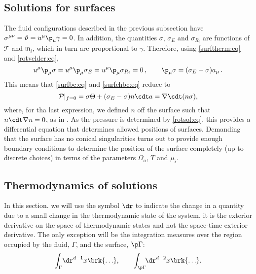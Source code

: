 \documentclass[12pt]{article}
\newcommand{\tloc}{\mathcal{T}}
\newcommand{\ploc}{\mathcal{P}}
\newcommand{\ml}{\mathfrak{m}}
\newcommand{\mg}{\mu}
\newcommand{\vint}{\int_\Gamma\!\dr^{d-1}x}
\newcommand{\aint}{\int_{\p\Gamma}\!\!\dr^{d-2}x}
\begin{document}
\subsection{Solutions for surfaces}\label{sec:rotsurf}

The fluid configurations described in the previous subsection have $\sigma^{\mu\nu}=\vartheta=u^\mu\p_\mu\gamma=0$.
In addition, the quantities $\sigma$, $\sigma_E$ and $\sigma_{R_i}$ are functions of $\tloc$ and $\ml_i$, which in turn are proportional to $\gamma$.
Therefore, using \eqref{surftherm:eq} and \eqref{rotvelder:eq},
%
\begin{equation}\label{rotsigmagrad:eq}
  u^\mu\p_\mu\sigma=u^\mu\p_\mu\sigma_E=u^\mu\p_\mu\sigma_{R_i}=0\,,
  \qquad
  \p_\mu \sigma = (\sigma_E - \sigma)a_\mu\,.
\end{equation}
%
This means that \eqref{surfbc:eq} and \eqref{surfchbc:eq} reduce to
%
\begin{equation}\label{rotsurfbc:eq}
  \ploc|_{f=0} = \sigma \Theta + (\sigma_E-\sigma)n\cdt a = \nabla\cdt(n\sigma),
\end{equation}
where, for tha last expression, we defined $n$ off the surface such that $n\cdt\nabla n=0$, as in .
As the pressure is determined by \eqref{rotsol:eq}, this provides a differential equation that determines allowed positions of surfaces. 
Demanding that the surface has no conical singularities turns out to provide enough boundary conditions to determine the position of the surface completely (up to discrete choices) in terms of the parameters $\Omega_a$, $T$ and $\mg_i$.

\subsection{Thermodynamics of solutions}\label{sec:rottherm}

In this section. we will use the symbol $\dr$ to indicate the change in a quantity due to a small change in the thermodynamic state of the system, \ie it is the exterior derivative on the space of thermodynamic states and not the space-time exterior derivative. The only exception will be the integration measures over the region occupied by the fluid, $\Gamma$, and the surface, $\p\Gamma$:
%
\begin{equation*}
  \vint\brk{\ldots}, \qquad \aint\brk{\ldots}.
\end{equation*}
%
\end{document}
